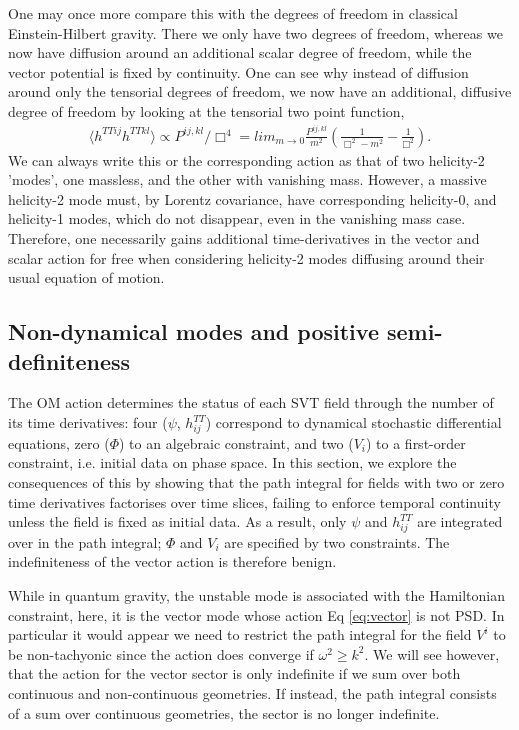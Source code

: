 \documentclass[aps,preprintnumbers,superscriptaddress,longbibliography]{revtex4-1}
\begin{document}
One may once more compare this with the degrees of freedom in classical Einstein-Hilbert gravity. There we only have two degrees of freedom, whereas we now have diffusion around an additional scalar degree of freedom, while the vector potential is fixed by continuity. One can see why instead of diffusion around only the tensorial degrees of freedom, we now have an additional, diffusive degree of freedom by looking at the tensorial two point function, 
\begin{align}
\langle h^{TTij}h^{TTkl}\rangle\propto P^{ij,kl}/\Box^4=lim_{m\rightarrow0}\frac{P^{ij,kl}}{m^2}(\frac{1}{\Box^2-m^2}-\frac{1}{\Box^2}).
\end{align}
We can always write this or the corresponding action as that of two helicity-2 'modes', one massless, and the other with vanishing mass. However, a massive helicity-2 mode must, by Lorentz covariance, have corresponding helicity-0, and helicity-1 modes, which do not disappear, even in the vanishing mass case. Therefore, one necessarily gains additional time-derivatives in the vector and scalar action for free when considering helicity-2 modes diffusing around their usual equation of motion.

\subsection{Non-dynamical modes and positive semi-definiteness}
\label{norm}


The OM action determines the status of each SVT field through the number of its time derivatives: four ($\psi$, $h^{TT}_{ij}$) correspond to dynamical stochastic differential equations, zero ($\Phi$) to an algebraic constraint, and two ($V_i$) to a first-order constraint, i.e. initial data on phase space. In this section, we explore the consequences of this by showing that the path integral for fields with two or zero time derivatives factorises over time slices,  failing to enforce temporal continuity unless the field is fixed as initial data. As a result, only $\psi$ and $h^{TT}_{ij}$ are integrated over in the path integral; $\Phi$ and $V_i$ are specified by two constraints. The indefiniteness of the vector action is therefore benign.


While in quantum gravity, the unstable mode is associated with the Hamiltonian constraint, here, it is the vector mode whose action Eq \eqref{eq:vector} is not PSD. In particular it would appear we need to restrict the path integral for the field $V^i$ to %
be non-tachyonic since the action does converge if $\omega^2\geq k^2$. 
We will see however, that the action for the vector sector is only indefinite if we sum over both continuous and non-continuous geometries. If instead, the path integral consists of a sum over continuous geometries, the sector is no longer indefinite. %
\end{document}
